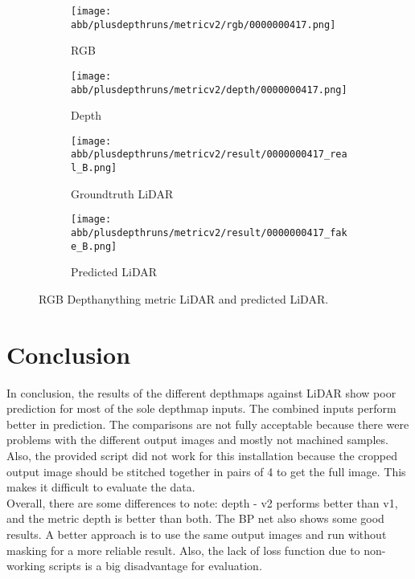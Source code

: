 \begin{figure}[!ht]
	\centering
	
	\begin{subfigure}{0.4\textwidth}
		\centering
		\texttt{[image: abb/plusdepthruns/metricv2/rgb/0000000417.png]}
		\caption{RGB}
		\label{fig:bild1}
	\end{subfigure}
	
	\vspace{1em} %
	
	\begin{subfigure}{0.4\textwidth}
		\centering
		\texttt{[image: abb/plusdepthruns/metricv2/depth/0000000417.png]}
		\caption{Depth}
		\label{fig:bild2}
	\end{subfigure}
	
	\vspace{1em} %
	
	\begin{subfigure}{0.25\textwidth}
		\centering
		\texttt{[image: abb/plusdepthruns/metricv2/result/0000000417\_real\_B.png]}
		\caption{Groundtruth LiDAR}
		\label{fig:bild3}
	\end{subfigure}
	\begin{subfigure}{0.25\textwidth}
		\centering
		\texttt{[image: abb/plusdepthruns/metricv2/result/0000000417\_fake\_B.png]}
		\caption{Predicted LiDAR}
		\label{fig:bild4}
	\end{subfigure}
	
	\caption{RGB Depthanything metric LiDAR and predicted LiDAR.}
	\label{metric_rgbd}
\end{figure}
\chapter{Conclusion}
In conclusion, the results of the different depthmaps against LiDAR show poor prediction for most of the sole depthmap inputs. The combined inputs perform better in prediction. The comparisons are not fully acceptable because there were problems with the different output images and mostly not machined samples. Also, the provided script did not work for this installation because the cropped output image should be stitched together in pairs of 4 to get the full image. This makes it difficult to evaluate the data. \newline \\Overall, there are some differences to note: depth - v2 performs better than v1, and the metric depth is better than both. The BP net also shows some good results. A better approach is to use the same output images and run without masking for a more reliable result. Also, the lack of loss function due to non-working scripts is a big disadvantage for evaluation.
\newpage
